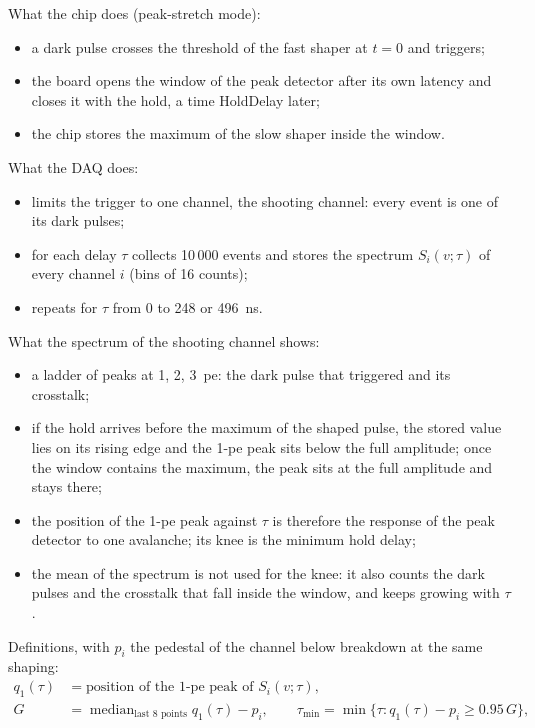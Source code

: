 \documentclass[11pt,a4paper]{article}
\begin{document}
What the chip does (peak-stretch mode):
\begin{itemize}
\item a dark pulse crosses the threshold of the fast shaper at $t = 0$ and triggers;
\item the board opens the window of the peak detector after its own latency and closes it
  with the hold, a time HoldDelay later;
\item the chip stores the maximum of the slow shaper inside the window.
\end{itemize}
What the DAQ does:
\begin{itemize}
\item limits the trigger to one channel, the shooting channel: every event is one of its dark
  pulses;
\item for each delay $\tau$ collects 10\,000 events and stores the spectrum $S_i(v;\tau)$ of
  every channel $i$ (bins of 16 counts);
\item repeats for $\tau$ from 0 to 248 or 496~ns.
\end{itemize}
What the spectrum of the shooting channel shows:
\begin{itemize}
\item a ladder of peaks at 1, 2, 3~pe: the dark pulse that triggered and its crosstalk;
\item if the hold arrives before the maximum of the shaped pulse, the stored value lies on
  its rising edge and the 1-pe peak sits below the full amplitude; once the window contains the
  maximum, the peak sits at the full amplitude and stays there;
\item the position of the 1-pe peak against $\tau$ is therefore the response of the peak
  detector to one avalanche; its knee is the minimum hold delay;
\item the mean of the spectrum is not used for the knee: it also counts the dark pulses and
  the crosstalk that fall inside the window, and keeps growing with $\tau$.
\end{itemize}
Definitions, with $p_i$ the pedestal of the channel below breakdown at the same shaping:
\begin{align*}
q_1(\tau) &= \text{position of the 1-pe peak of } S_i(v;\tau), \\
G &= \operatorname{median}_{\text{last 8 points}} q_1(\tau) - p_i, \qquad
\tau_\mathrm{min} = \min\{\tau : q_1(\tau) - p_i \ge 0.95\,G\},
\end{align*}
\end{document}
